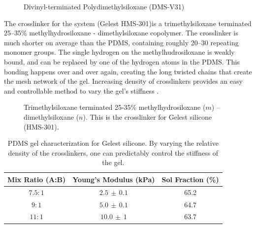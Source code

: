 \begin{figure}[h!]
	\centering
	\label{fig:DMS-V31}
	\caption[DMS-V31]{Divinyl-terminated Polydimethylsiloxane (DMS-V31)}
\end{figure}
\noindent The crosslinker for the system (Gelest HMS-301)is a trimethylsiloxane terminated 25--35\% methylhydrosiloxane - dimethylsiloxane copolymer. The crosslinker is much shorter on average than the PDMS, containing roughly 20--30 repeating monomer groups. The single hydrogen on the methylhudrosiloxane is weakly bound, and can be replaced by one of the hydrogen atoms in the PDMS. This bonding happens over and over again, creating the long twisted chains that create the mesh network of the gel. Increasing density of crosslinkers provides an easy and controllable method to vary the gel's stiffness \cite{Andreotti2020}. 

\begin{figure}
	\centering
	\label{fig:HMS-301}
	\caption[HMS-301]{Trimethylsiloxane terminated 25-35\% methylhydrosiloxane ($m$) -- dimethylsiloxane ($n$). This is the crosslinker for Gelest silicone (HMS-301).}
\end{figure}

\begin{table}[h!]
	\begin{center}
		\begin{tabular}{|c||c||c|}
			\hline
			Mix Ratio (A:B) & Young's Modulus (kPa) & Sol Fraction (\%)\\
			\hline
			$7.5:1$ & $2.5 \,\pm\, 0.1$ & 65.2\\
			\hline
			$9:1$ & $5.0 \, \pm\, 0.1$  & 64.7\\
			\hline
			$11:1$ & $10.0 \,\pm\, 1$  & 63.7\\
			\hline
		\end{tabular}
	\end{center}
	\label{tab:recipes}
	\caption[PDMS ratios Characterization]{PDMS gel characterization for Gelest silicone. By varying the relative density of the crosslinkers, one can predictably control the stiffness of the gel.}
\end{table}




